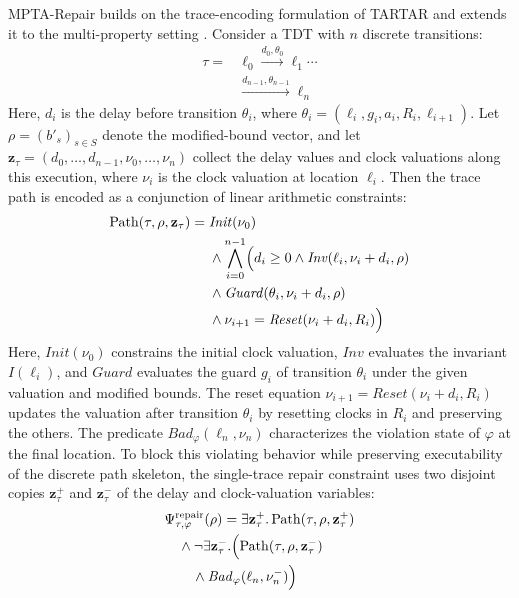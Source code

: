 MPTA-Repair builds on the trace-encoding formulation of TARTAR and
extends it to the multi-property setting \cite{kolbl2019clock}.
Consider a TDT with $n$ discrete transitions:
\begin{equation}
\begin{aligned}
  \tau ={}&
  \ell_0 \xrightarrow{d_0,\theta_0} \ell_1 \cdots \\
  &{}\xrightarrow{d_{n-1},\theta_{n-1}} \ell_n
\end{aligned}
\end{equation}
Here, $d_i$ is the delay before transition $\theta_i$, where
$\theta_i=(\ell_i,g_i,a_i,R_i,\ell_{i+1})$.
Let $\rho=(b'_s)_{s\in S}$ denote the modified-bound vector, and let
$\mathbf{z}_{\tau}=(d_0,\ldots,d_{n-1},\nu_0,\ldots,\nu_n)$ collect
the delay values and clock valuations along this execution, where
$\nu_i$ is the clock valuation at location $\ell_i$. Then the trace path
is encoded as a conjunction of linear arithmetic constraints:
\begin{equation}
\begin{aligned}
  \operatorname{Path}(\tau,\rho,\mathbf{z}_{\tau})
  ={}& \mathit{Init}(\nu_0)\\
  &{}\land
  \bigwedge_{i=0}^{n-1}\Bigl(
    d_i \ge 0
    \land \mathit{Inv}(\ell_i,\nu_i+d_i,\rho)\\
  &{}\land
    \mathit{Guard}(\theta_i,\nu_i+d_i,\rho)\\
  &{}\land
    \nu_{i+1}
    =
    \mathit{Reset}(\nu_i+d_i,R_i)
  \Bigr)
\end{aligned}
\end{equation}
Here, $\mathit{Init}(\nu_0)$ constrains the initial clock valuation,
$\mathit{Inv}$ evaluates the invariant $I(\ell_i)$, and
$\mathit{Guard}$ evaluates the guard $g_i$ of transition $\theta_i$
under the given valuation and modified bounds. The reset equation
$\nu_{i+1}=\mathit{Reset}(\nu_i+d_i,R_i)$ updates the valuation after
transition $\theta_i$ by resetting clocks in $R_i$ and preserving the
others.
The predicate $\mathit{Bad}_{\varphi}(\ell_n,\nu_n)$ characterizes the
violation state of $\varphi$ at the final location. To block this
violating behavior while preserving executability of the discrete path
skeleton, the single-trace repair constraint uses two disjoint copies
$\mathbf{z}_{\tau}^{+}$ and $\mathbf{z}_{\tau}^{-}$ of the delay and
clock-valuation variables:
\begin{equation}
\begin{aligned}
  &\Psi_{\tau,\varphi}^{\mathrm{repair}}(\rho)
  =
  \exists \mathbf{z}_{\tau}^{+}.
  \operatorname{Path}(\tau,\rho,\mathbf{z}_{\tau}^{+}) \\
  &\quad{}\land
  \neg \exists \mathbf{z}_{\tau}^{-}.
  \Bigl(
    \operatorname{Path}(\tau,\rho,\mathbf{z}_{\tau}^{-}) \\
  &\qquad{}\land
    \mathit{Bad}_{\varphi}(\ell_n,\nu_n^{-})
  \Bigr)
\end{aligned}
\end{equation}
